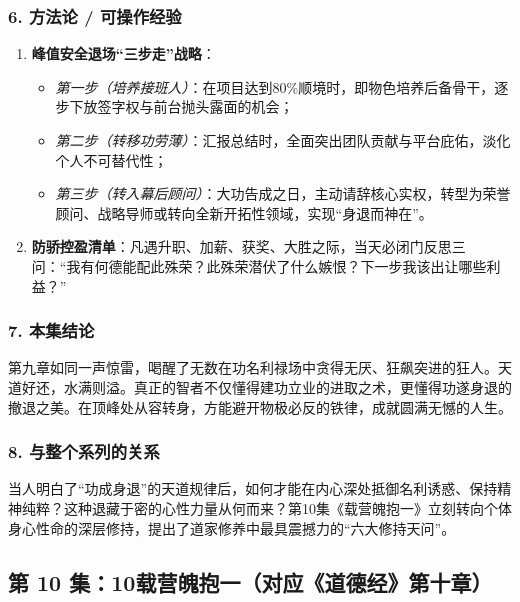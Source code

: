 \subsubsection{6. 方法论 / 可操作经验}
\begin{enumerate}
    \item \textbf{峰值安全退场“三步走”战略}：
    \begin{itemize}
        \item \emph{第一步（培养接班人）}：在项目达到80\%顺境时，即物色培养后备骨干，逐步下放签字权与前台抛头露面的机会；
        \item \emph{第二步（转移功劳薄）}：汇报总结时，全面突出团队贡献与平台庇佑，淡化个人不可替代性；
        \item \emph{第三步（转入幕后顾问）}：大功告成之日，主动请辞核心实权，转型为荣誉顾问、战略导师或转向全新开拓性领域，实现“身退而神在”。
    \end{itemize}
    \item \textbf{防骄控盈清单}：凡遇升职、加薪、获奖、大胜之际，当天必闭门反思三问：“我有何德能配此殊荣？此殊荣潜伏了什么嫉恨？下一步我该出让哪些利益？”
\end{enumerate}

\subsubsection{7. 本集结论}
第九章如同一声惊雷，喝醒了无数在功名利禄场中贪得无厌、狂飙突进的狂人。天道好还，水满则溢。真正的智者不仅懂得建功立业的进取之术，更懂得功遂身退的撤退之美。在顶峰处从容转身，方能避开物极必反的铁律，成就圆满无憾的人生。

\subsubsection{8. 与整个系列的关系}
当人明白了“功成身退”的天道规律后，如何才能在内心深处抵御名利诱惑、保持精神纯粹？这种退藏于密的心性力量从何而来？第10集《载营魄抱一》立刻转向个体身心性命的深层修持，提出了道家修养中最具震撼力的“六大修持天问”。

\clearpage

\subsection{第 10 集：10载营魄抱一（对应《道德经》第十章）}
\label{sec:ep10}

